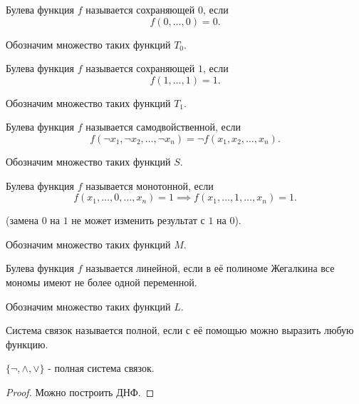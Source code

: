 \begin{definition} \thmslashn 

    Булева функция $f$ называется сохраняющей $0$, если
    \[ f(0, \ldots, 0) = 0 .\]

    Обозначим множество таких функций $T_0$.
\end{definition}
\begin{definition} \thmslashn 

    Булева функция $f$ называется сохраняющей $1$, если
    \[ f(1, \ldots, 1) = 1 .\]

    Обозначим множество таких функций $T_1$.
\end{definition}
\begin{definition} \thmslashn 

    Булева функция $f$ называется самодвойственной, если
    \[ f(\neg x_1, \neg x_2, \ldots, \neg x_n) = \neg f(x_1, x_2, \ldots, x_{n}) .\]

    Обозначим множество таких функций $S$.
\end{definition}
\begin{definition} \thmslashn 

    Булева функция $f$ называется монотонной, если
    \[ f(x_1, \ldots, 0, \ldots, x_{n}) = 1 \implies f(x_1, \ldots, 1, \ldots, x_{n})  = 1.\]

    (замена $0$ на $1$ не может изменить результат с $1$ на $0$).

    Обозначим множество таких функций $M$.
\end{definition}
\begin{definition} \thmslashn 

    Булева функция $f$ называется линейной, если в её полиноме Жегалкина все мономы имеют не более одной переменной.

    Обозначим множество таких функций $L$.
\end{definition}
\begin{definition} \thmslashn 

    Система связок называется полной, если с её помощью можно выразить любую функцию.
\end{definition}
\begin{lemma} \thmslashn

    $\{\neg, \land, \lor\} $ - полная система связок.
    \begin{proof} \thmslashn
    
        Можно построить ДНФ.
    \end{proof}
\end{lemma}

